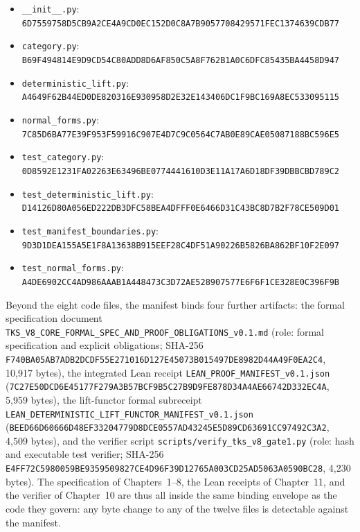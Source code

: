 \begin{itemize}
\item \texttt{\_\_init\_\_.py}: \\
      \texttt{6D7559758D5CB9A2CE4A9CD0EC152D0C8A7B9057708429571FEC1374639CDB77}
\item \texttt{category.py}: \\
      \texttt{B69F494814E9D9CD54C80ADD8D6AF850C5A8F762B1A0C6DFC85435BA4458D947}
\item \texttt{deterministic\_lift.py}: \\
      \texttt{A4649F62B44ED0DE820316E930958D2E32E143406DC1F9BC169A8EC533095115}
\item \texttt{normal\_forms.py}: \\
      \texttt{7C85D6BA77E39F953F59916C907E4D7C9C0564C7AB0E89CAE05087188BC596E5}
\item \texttt{test\_category.py}: \\
      \texttt{0D8592E1231FA02263E63496BE0774441610D3E11A17A6D18DF39DBBCBD789C2}
\item \texttt{test\_deterministic\_lift.py}: \\
      \texttt{D14126D80A056ED222DB3DFC58BEA4DFFF0E6466D31C43BC8D7B2F78CE509D01}
\item \texttt{test\_manifest\_boundaries.py}: \\
      \texttt{9D3D1DEA155A5E1F8A13638B915EEF28C4DF51A90226B5826BA862BF10F2E097}
\item \texttt{test\_normal\_forms.py}: \\
      \texttt{A4DE6902CC4AD986AAAB1A448473C3D72AE528907577E6F6F1CE328E0C396F9B}
\end{itemize}

Beyond the eight code files, the manifest binds four further artifacts:
the formal specification document
\texttt{TKS\_V8\_CORE\_FORMAL\_SPEC\_AND\_PROOF\_OBLIGATIONS\_v0.1.md}
(role: formal specification and explicit obligations; SHA-256
\texttt{F740BA05AB7ADB2DCDF55E271016D127E45073B015497DE8982D44A49F0EA2C4},
10{,}917 bytes), the integrated Lean receipt
\texttt{LEAN\_PROOF\_MANIFEST\_v0.1.json}
(\texttt{7C27E50DCD6E45177F279A3B57BCF9B5C27B9D9FE878D34A4AE66742D332EC4A},
5{,}959 bytes), the lift-functor formal subreceipt
\texttt{LEAN\_DETERMINISTIC\_LIFT\_FUNCTOR\_MANIFEST\_v0.1.json}
(\texttt{BEED66D60666D48EF33204779D8DCE0557AD43245E5D89CD63691CC97492C3A2},
4{,}509 bytes), and the verifier script
\texttt{scripts/verify\_tks\_v8\_gate1.py} (role: hash and executable test
verifier; SHA-256
\texttt{E4FF72C5980059BE9359509827CE4D96F39D12765A003CD25AD5063A0590BC28},
4{,}230 bytes). The specification of Chapters~1--8, the Lean receipts of
Chapter~11, and the verifier of Chapter~10 are thus all inside the same
binding envelope as the code they govern: any byte change to any of the
twelve files is detectable against the manifest.

